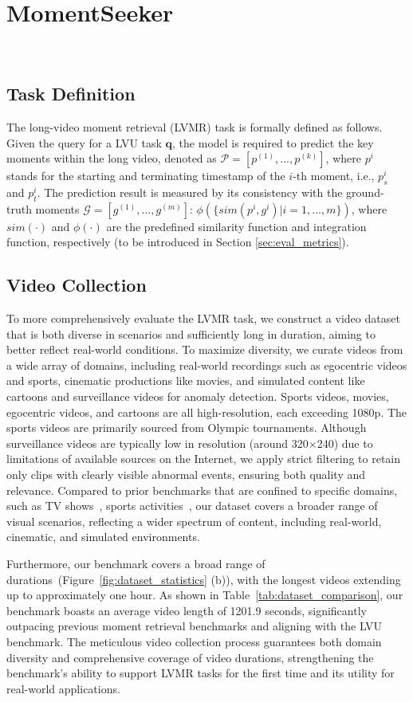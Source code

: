 \documentclass{article}
\begin{document}
\section{MomentSeeker}~\label{sec:momentseeker}
\subsection{Task Definition}
The long-video moment retrieval (LVMR) task is formally defined as follows. Given the query for a LVU task $\textbf{q}$, the model is required to predict the key moments within the long video, denoted as $\mathcal{P} = [p^{(1)}, ..., p^{(k)}]$, where $p^i$ stands for the starting and terminating timestamp of the $i$-th moment, i.e., $p^i_s$ and $p^i_t$. The prediction result is measured by its consistency with the ground-truth moments $\mathcal{G} = [g^{(1)}, ..., g^{(m)}]$: $\phi(\{sim(p^i, g^i)|i=1,...,m\})$, where $sim(\cdot)$ and $\phi(\cdot)$ are the predefined similarity function and integration function, respectively (to be introduced in Section \ref{sec:eval_metrics}). 


\subsection{Video Collection}
To more comprehensively evaluate the LVMR task, we construct a video dataset that is both diverse in scenarios and sufficiently long in duration, aiming to better reflect real-world conditions.
To maximize diversity, we curate videos from a wide array of domains, including real-world recordings such as egocentric videos and sports, cinematic productions like movies, and simulated content like cartoons and surveillance videos for anomaly detection. Sports videos, movies, egocentric videos, and cartoons are all high-resolution, each exceeding 1080p. The sports videos are primarily sourced from Olympic tournaments. Although surveillance videos are typically low in resolution (around 320×240) due to limitations of available sources on the Internet, we apply strict filtering to retain only clips with clearly visible abnormal events, ensuring both quality and relevance. Compared to prior benchmarks that are confined to specific domains, such as TV shows~\cite{lei2020tvr}, sports activities~\cite{gao2017charadeSTA,THUMOS14},  our dataset covers a broader range of visual scenarios, reflecting a wider spectrum of content, including real-world, cinematic, and simulated environments.

Furthermore, our benchmark covers a broad range of durations~(Figure~\ref{fig:dataset_statistics} (b)), with the longest videos extending up to approximately one hour. As shown in Table~\ref{tab:dataset_comparison}, our benchmark boasts an average video length of 1201.9 seconds, significantly outpacing previous moment retrieval benchmarks and aligning with the LVU benchmark. The meticulous video collection process guarantees both domain diversity and comprehensive coverage of video durations, strengthening the benchmark's ability to support LVMR tasks for the first time and its utility for real-world applications.
\end{document}
